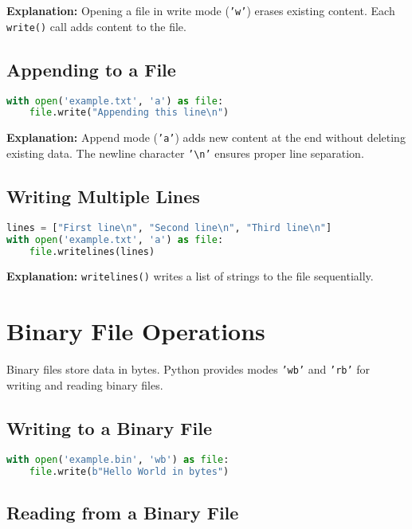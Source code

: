 \textbf{Explanation:} Opening a file in write mode (\texttt{'w'}) erases existing content. Each \texttt{write()} call adds content to the file.

\subsection{Appending to a File}

\begin{lstlisting}[language=Python]
with open('example.txt', 'a') as file:
    file.write("Appending this line\n")
\end{lstlisting}

\textbf{Explanation:} Append mode (\texttt{'a'}) adds new content at the end without deleting existing data. The newline character \texttt{'\textbackslash n'} ensures proper line separation.

\subsection{Writing Multiple Lines}

\begin{lstlisting}[language=Python]
lines = ["First line\n", "Second line\n", "Third line\n"]
with open('example.txt', 'a') as file:
    file.writelines(lines)
\end{lstlisting}

\textbf{Explanation:} \texttt{writelines()} writes a list of strings to the file sequentially.

\section{Binary File Operations}

Binary files store data in bytes. Python provides modes \texttt{'wb'} and \texttt{'rb'} for writing and reading binary files.

\subsection{Writing to a Binary File}

\begin{lstlisting}[language=Python]
with open('example.bin', 'wb') as file:
    file.write(b"Hello World in bytes")
\end{lstlisting}

\subsection{Reading from a Binary File}

